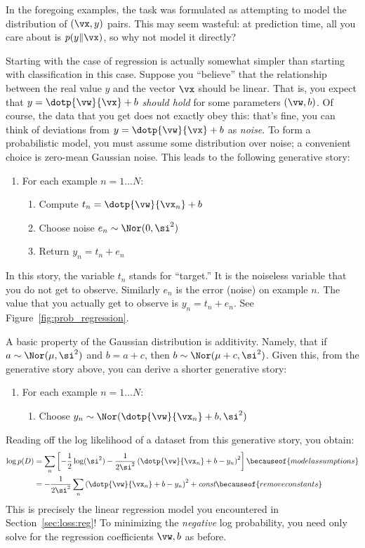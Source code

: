 In the foregoing examples, the task was formulated as attempting to
model the  distribution of $(\vx,y)$ pairs.  This may
seem wasteful: at prediction time, all you care about is $p(y\|\vx)$,
so why not model it directly?

Starting with the case of regression is actually somewhat simpler than
starting with classification in this case.  Suppose you ``believe''
that the relationship between the real value $y$ and the vector $\vx$
should be linear.  That is, you expect that $y = \dotp{\vw}{\vx}+b$
\emph{should hold} for some parameters $(\vw,b)$.  Of course, the data
that you get does not exactly obey this: that's fine, you can think of
deviations from $y = \dotp{\vw}{\vx}+b$ as \emph{noise}.  To form a
probabilistic model, you must assume some distribution over noise; a
convenient choice is zero-mean Gaussian noise.  This leads to the
following generative story:
%
\begin{enumerate}
  \item For each example $n=1 \dots N$:
    \begin{enumerate}
      \item Compute $t_n = \dotp{\vw}{\vx_n} + b$
      \item Choose noise $e_n \sim \Nor(0, \si^2)$
      \item Return $y_n = t_n + e_n$
    \end{enumerate}
\end{enumerate}
%
In this story, the variable $t_n$ stands for ``target.''  It is the
noiseless variable that you do not get to observe.  Similarly $e_n$ is
the error (noise) on example $n$.  The value that you actually get to
observe is $y_n = t_n + e_n$.  See Figure~\ref{fig:prob_regression}.


A basic property of the Gaussian distribution is additivity.  Namely,
that if $a \sim \Nor(\mu,\si^2)$ and $b = a + c$, then $b \sim
\Nor(\mu+c,\si^2)$.  Given this, from the generative story above, you
can derive a shorter generative story:
%
\begin{enumerate}
  \item For each example $n=1 \dots N$:
    \begin{enumerate}
      \item Choose $y_n \sim \Nor( \dotp{\vw}{\vx_n} + b, \si^2)$
    \end{enumerate}
\end{enumerate}
%
Reading off the log likelihood of a dataset from this generative
story, you obtain:
%
\begin{align}
   \log p(D)
&= \sum_n \left[
     - \frac 1 2 \log(\si^2)
     - \frac 1 {2 \si^2} \left( \dotp{\vw}{\vx_n} + b - y_n \right)^2
     \right]
   \becauseof{model assumptions}\\
&= - \frac 1 {2 \si^2}  \sum_n \left( \dotp{\vw}{\vx_n} + b - y_n \right)^2
   + \textit{const}
   \becauseof{remove constants}
\end{align}
%
This is precisely the linear regression model you encountered in
Section~\ref{sec:loss:reg}!  To minimizing the \emph{negative} log
probability, you need only solve for the regression coefficients
$\vw,b$ as before.

